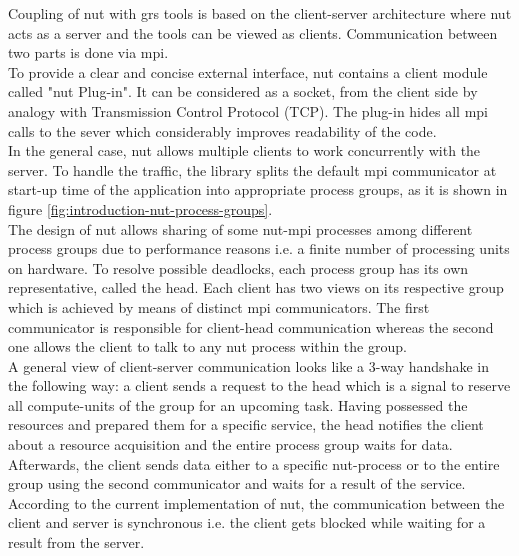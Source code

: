 Coupling of \acrshort{nut} with \acrshort{grs} tools is based on the client-server architecture where \acrshort{nut} acts as a server and the tools can be viewed as clients. Communication between two parts is done via \acrshort{mpi}.\\


To provide a clear and concise external interface, \acrshort{nut} contains a client module called "\acrshort{nut} Plug-in". It can be  considered as a socket, from the client side by analogy with Transmission Control Protocol (TCP). The plug-in hides all \acrshort{mpi} calls to the sever which considerably improves readability of the code.\\


In the general case, \acrshort{nut} allows multiple clients to work concurrently with the server. To handle the traffic, the library splits the default \acrshort{mpi} communicator at start-up time of the application into appropriate process groups, as it is shown in figure \ref{fig:introduction-nut-process-groups}.\\



The design of \acrshort{nut} allows sharing of some \acrshort{nut}-\acrshort{mpi} processes among different process groups due to performance reasons i.e. a finite number of processing units on hardware. To resolve possible deadlocks, each process group has its own representative, called the head. Each client has two views on its respective group which is achieved by means of distinct \acrshort{mpi} communicators. The first communicator is responsible for client-head communication whereas the second one allows the client to talk to any \acrshort{nut} process within the group.\\



A general view of client-server communication looks like a 3-way handshake in the following way: a client sends a request to the head which is a signal to reserve all compute-units of the group for an upcoming task. Having possessed the resources and prepared them for a specific service, the head notifies the client about a resource acquisition and the entire process group waits for data. Afterwards, the client sends data either to a specific \acrshort{nut}-process or to the entire group using the second communicator and waits for a result of the service. According to the current implementation of \acrshort{nut}, the communication between the client and server is synchronous i.e. the client gets blocked while waiting for a result from the server. \\


